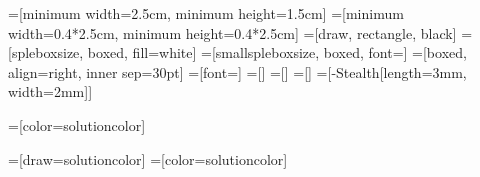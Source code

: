 \newif\ifSpleHighlightCustomDevelopment{}
\newif\ifSpleHighlightProblemAndSolutionSpace{}

\SpleHighlightCustomDevelopmenttrue{}
\SpleHighlightProblemAndSolutionSpacetrue{}

\newcommand{\spleboxwidth}{2.5cm}
\newcommand{\spleboxheight}{1.5cm}
\newcommand{\deaeText}[1]{#1}%
\newcommand{\spleboxcontent}[1]{\parbox{\spleboxwidth}{\centering\deaeText{#1}}}

=[minimum width=\spleboxwidth, minimum height=\spleboxheight]
=[minimum width=0.4*\spleboxwidth, minimum height=0.4*\spleboxwidth]
=[draw, rectangle, black]
=[spleboxsize, boxed, fill=white]
=[smallspleboxsize, boxed, font={\footnotesize}]
=[boxed, align=right, inner sep=30pt]
=[font={\footnotesize}] %
=[]
=[]
=[]
=[-{Stealth[length=3mm, width=2mm]}]

\renewcommand{\deaeText}[1]{{#1}}
=[color=solutioncolor]

\ifSpleHighlightCustomDevelopment%
  =[draw=solutioncolor]
  =[color=solutioncolor]
\fi

